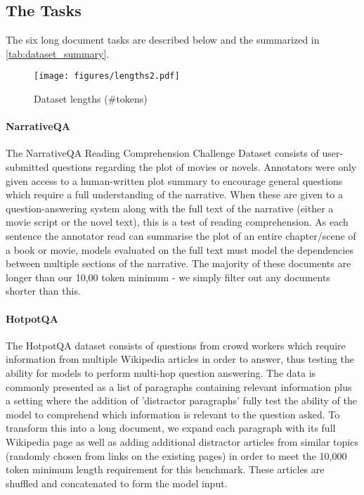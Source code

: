 \documentclass[10pt, a4paper]{article}
\begin{document}
\subsection{The Tasks}


The six long document tasks are described below and the summarized in \autoref{tab:dataset_summary}.

\begin{figure*}
    \centering
    \texttt{[image: figures/lengths2.pdf]}
    \caption{Dataset lengths (\#tokens)}
    \label{fig:ds_lengths}
\end{figure*}



\paragraph{NarrativeQA}
The NarrativeQA Reading Comprehension Challenge Dataset \cite{Kocisky_2018} consists of user-submitted questions regarding the plot of movies or novels. Annotators were only given access to a human-written plot summary to encourage general questions which require a full understanding of the narrative. When these are given to a question-answering system along with the full text of the narrative (either a movie script or the novel text), this is a test of reading comprehension. As each sentence the annotator read can summarise the plot of an entire chapter/scene of a book or movie, models evaluated on the full text must model the dependencies between multiple sections of the narrative. The majority of these documents are longer than our 10,00 token minimum - we simply filter out any documents shorter than this.

\paragraph{HotpotQA} The HotpotQA dataset consists of questions from crowd workers which require information from multiple Wikipedia articles in order to answer, thus testing the ability for models to perform multi-hop question answering. The data is commonly presented as a list of paragraphs containing relevant information plus a setting where the addition of 'distractor paragraphs' fully test the ability of the model to comprehend which information is relevant to the question asked. To transform this into a long document, we expand each paragraph with its full Wikipedia page as well as adding additional distractor articles from similar topics (randomly chosen from links on the existing pages) in order to meet the 10,000 token minimum length requirement for this benchmark. These articles are shuffled and concatenated to form the model input.
\end{document}
